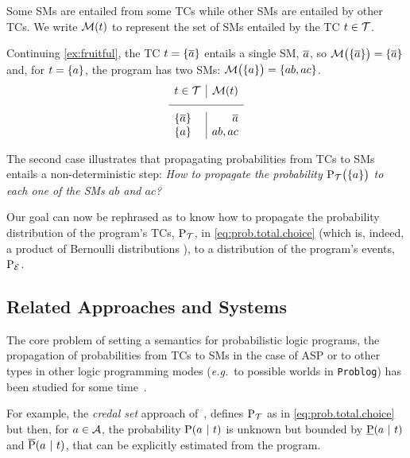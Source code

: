 \documentclass[x11names]{tlp}
\renewcommand{\cite}{\citep}
\begin{document}
Some \aclp{SM} are entailed from some \aclp{TC} while other \acp{SM} are
entailed by other \acp{TC}. We write $\tcgen{t}$ to represent the set of
\aclp{SM} entailed by the \acl{TC} $t \in \TCHOICEset$.

\ifExamples
	\begin{example}%
		\em

		Continuing \cref{ex:fruitful}, the \acl{TC} $t = \set{\ensuremath{\overline{a}}}$ entails a
		single \acl{SM}, $\overline{a}$, so $ \MODELset\at{\set{\co{a}}} = \set{\co{a}} $
		and, for $t = \set{a}$, the program has two \aclp{SM}: $
			\MODELset\at{\set{a}} = \set{ab, ac}$.
		\begin{equation*}
			\begin{array}{l|r}
				t \in \TCHOICEset   & \MODELset\at{t} %
				\\
				\hline \set{\co{a}} & \co{a}          %
				\\
				\set{a}             & ab, ac
			\end{array}
		\end{equation*}

		The second case illustrates that propagating probabilities from \aclp{TC} to
		\aclp{SM} entails a non-deterministic step: \textit{How to propagate the
			probability $\prT\at{\set{a}}$ to each one of the \aclp{SM} $ab$ and $ac$?}
	\end{example}
\fi

Our goal can now be rephrased as to know how to propagate the probability
distribution of the program's \aclp{TC}, $\prT$, in
\cref{eq:prob.total.choice} (which is, indeed, a product of Bernoulli
distributions \cite{Teugels90}), to a distribution of the program's events,
$\prE$.

\subsection*{Related Approaches and Systems}
\label{ssec:other.approaches}

The core problem of setting a semantics for probabilistic logic programs, the
propagation of probabilities from \aclp{TC} to \aclp{SM} in the case of
\ac{ASP} or to other types in other logic programming modes (\emph{e.g.}\ to
possible worlds in \texttt{Problog}) has been studied for some
time~\cite{kifer1992theory,sato1995statistical}.

For example, the \emph{credal set} approach of~\cite{cozman2020joy}, defines
$\prT$ as in \cref{eq:prob.total.choice} but then, for $a \in \ATOMSset$, the
probability $\pr{a \given t}$ is unknown but bounded by
$\underbar{\prfunc}\at{a \given t}$ and $\overline{\prfunc}\at{a \given t}$,
that can be explicitly estimated from the program.
\end{document}
